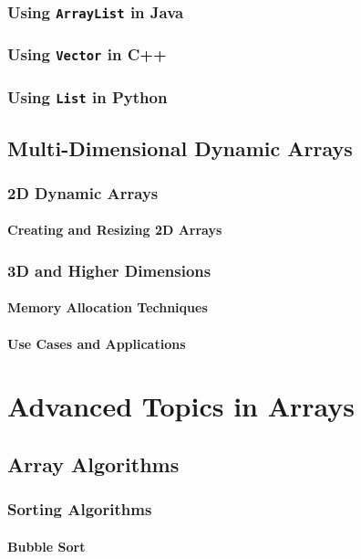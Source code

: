 \documentclass{book}
\begin{document}
	\subsection{Using \texttt{ArrayList} in Java}
	\subsection{Using \texttt{Vector} in C++}
	\subsection{Using \texttt{List} in Python}
	
	\section{Multi-Dimensional Dynamic Arrays}
	\subsection{2D Dynamic Arrays}
	\subsubsection{Creating and Resizing 2D Arrays}
	\subsection{3D and Higher Dimensions}
	\subsubsection{Memory Allocation Techniques}
	\subsubsection{Use Cases and Applications}
	
\chapter{Advanced Topics in Arrays}
	\section{Array Algorithms}
	\subsection{Sorting Algorithms}
	\subsubsection{Bubble Sort}
\end{document}

